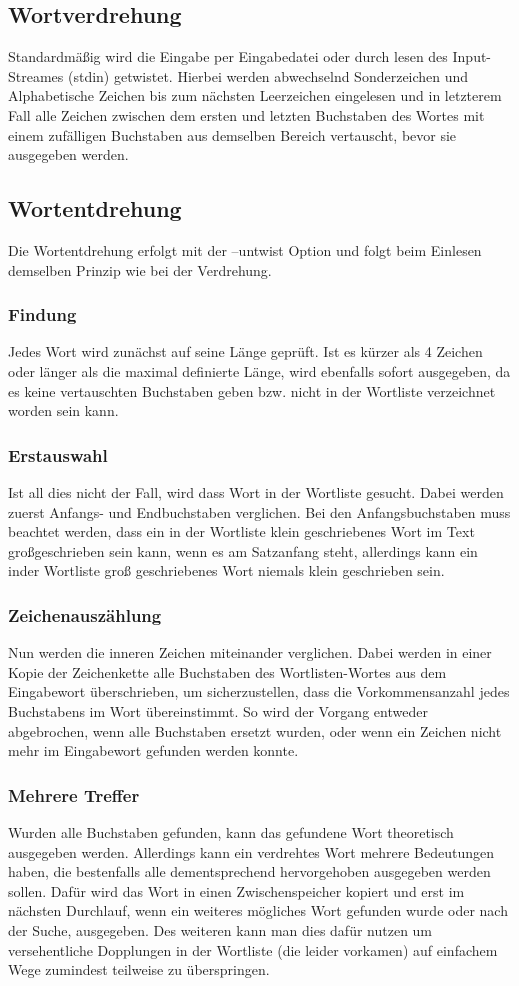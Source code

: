 \documentclass[a4paper,10pt,ngerman]{scrartcl}
\newcommand{\newsubsection}{\vspace{2\baselineskip}\subsection}
\newcommand{\newsubsubsection}{\vspace{1\baselineskip}\subsubsection}
\begin{document}
\pagebreak
\newsubsection{Wortverdrehung}

Standardmäßig wird die Eingabe per Eingabedatei oder durch lesen des Input-Streames (stdin) getwistet.
Hierbei werden abwechselnd Sonderzeichen und Alphabetische Zeichen bis zum nächsten Leerzeichen eingelesen und in letzterem Fall alle Zeichen zwischen dem ersten und letzten Buchstaben des Wortes mit einem zufälligen Buchstaben aus demselben Bereich vertauscht, bevor sie ausgegeben werden.

\newsubsection{Wortentdrehung}

Die Wortentdrehung erfolgt mit der --untwist Option und folgt beim Einlesen demselben Prinzip wie bei der Verdrehung.

\newsubsubsection{Findung}
Jedes Wort wird zunächst auf seine Länge geprüft. Ist es kürzer als 4 Zeichen oder länger als die maximal definierte Länge, wird ebenfalls sofort ausgegeben, da es keine vertauschten Buchstaben geben bzw. nicht in der Wortliste verzeichnet worden sein kann.

\newsubsubsection{Erstauswahl}
Ist all dies nicht der Fall, wird dass Wort in der Wortliste gesucht. Dabei werden zuerst Anfangs- und Endbuchstaben verglichen. Bei den Anfangsbuchstaben muss beachtet werden, dass ein in der Wortliste klein geschriebenes Wort im Text großgeschrieben sein kann, wenn es am Satzanfang steht, allerdings kann ein inder Wortliste groß geschriebenes Wort niemals klein geschrieben sein.

\newsubsubsection{Zeichenauszählung}
Nun werden die inneren Zeichen miteinander verglichen. Dabei werden in einer Kopie der Zeichenkette alle Buchstaben des Wortlisten-Wortes aus dem Eingabewort überschrieben, um sicherzustellen, dass die Vorkommensanzahl jedes Buchstabens im Wort übereinstimmt. So wird der Vorgang entweder abgebrochen, wenn alle Buchstaben ersetzt wurden, oder wenn ein Zeichen nicht mehr im Eingabewort gefunden werden konnte.

\newsubsubsection{Mehrere Treffer}
Wurden alle Buchstaben gefunden, kann das gefundene Wort theoretisch ausgegeben werden. Allerdings kann ein verdrehtes Wort mehrere Bedeutungen haben, die bestenfalls alle dementsprechend hervorgehoben ausgegeben werden sollen. Dafür wird das Wort in einen Zwischenspeicher kopiert und erst im nächsten Durchlauf, wenn ein weiteres mögliches Wort gefunden wurde oder nach der Suche, ausgegeben. Des weiteren kann man dies dafür nutzen um versehentliche Dopplungen in der Wortliste (die leider vorkamen) auf einfachem Wege zumindest teilweise zu überspringen.
\end{document}
